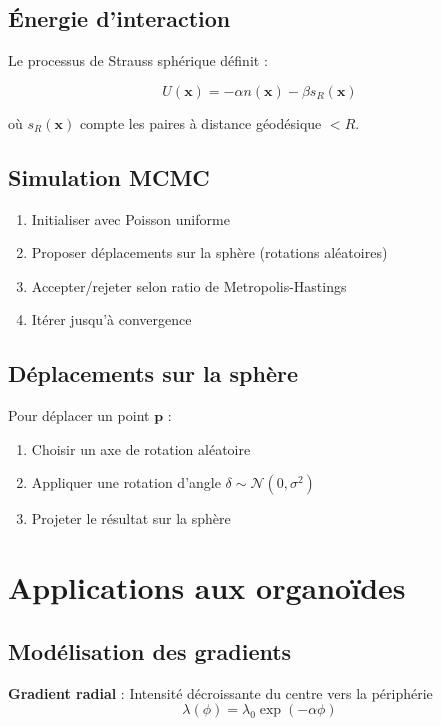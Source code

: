 \subsection{Énergie d'interaction}

Le processus de Strauss sphérique définit :

\[
U(\mathbf{x}) = -\alpha n(\mathbf{x}) - \beta s_R(\mathbf{x})
\]

où $s_R(\mathbf{x})$ compte les paires à distance géodésique $< R$.

\subsection{Simulation MCMC}

\begin{enumerate}
    \item Initialiser avec Poisson uniforme
    \item Proposer déplacements sur la sphère (rotations aléatoires)
    \item Accepter/rejeter selon ratio de Metropolis-Hastings
    \item Itérer jusqu'à convergence
\end{enumerate}

\subsection{Déplacements sur la sphère}

Pour déplacer un point $\mathbf{p}$ :
\begin{enumerate}
    \item Choisir un axe de rotation aléatoire
    \item Appliquer une rotation d'angle $\delta \sim \mathcal{N}(0, \sigma^2)$
    \item Projeter le résultat sur la sphère
\end{enumerate}

\section{Applications aux organoïdes}

\subsection{Modélisation des gradients}

\textbf{Gradient radial} : Intensité décroissante du centre vers la périphérie
\[
\lambda(\phi) = \lambda_0 \exp(-\alpha \phi)
\]

